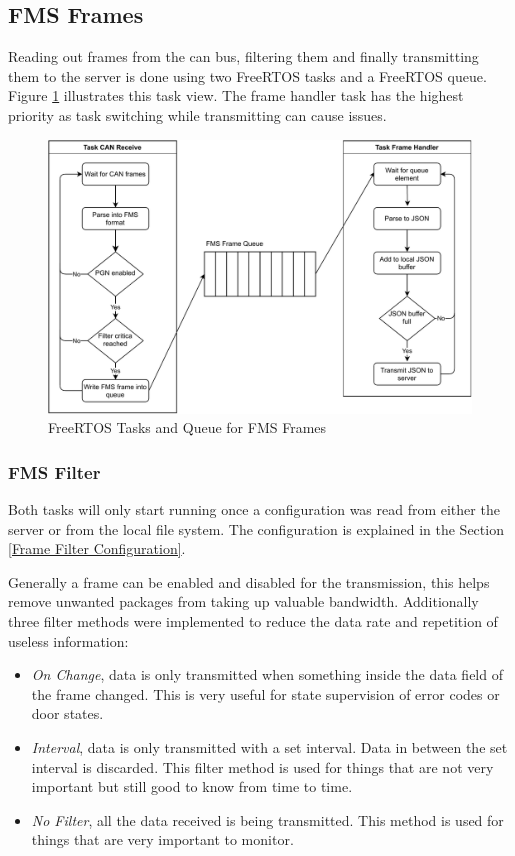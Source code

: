 \newpage
\subsection{FMS Frames} \label{FMS Frame Handler}
Reading out frames from the \acrshort{can} bus, filtering them and finally transmitting them to the server is done using two FreeRTOS tasks and a FreeRTOS queue. Figure \ref{fig:fms-software} illustrates this task view. The frame handler task has the highest priority as task switching while transmitting can cause issues.
\begin{figure}[h!]
	\centering
	\includegraphics[width=\textwidth]{images/fms-software}
	\caption{FreeRTOS Tasks and Queue for FMS Frames}
	\label{fig:fms-software}
\end{figure}

\subsubsection{FMS Filter}
Both tasks will only start running once a configuration was read from either the server or from the local file system. The configuration is explained in the Section \ref{Frame Filter Configuration}.

Generally a frame can be enabled and disabled for the transmission, this helps remove unwanted packages from taking up valuable bandwidth. Additionally three filter methods were implemented to reduce the data rate and repetition of useless information:
\begin{itemize}
		\item \textit{On Change}, data is only transmitted when something inside the data field of the frame changed. This is very useful for state supervision of error codes or door states. 
		\item \textit{Interval}, data is only transmitted with a set interval. Data in between the set interval is discarded. This filter method is used for things that are not very important but still good to know from time to time.
		\item \textit{No Filter}, all the data received is being transmitted. This method is used for things that are very important to monitor.
\end{itemize}

